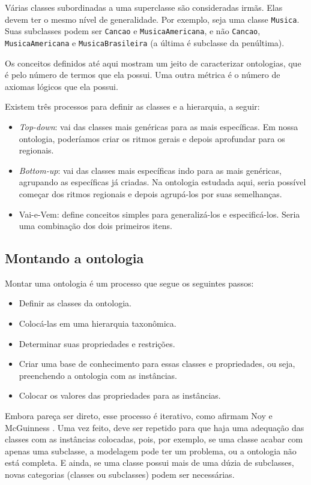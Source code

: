 Várias classes subordinadas a uma superclasse são consideradas irmãs. Elas devem ter o mesmo nível de generalidade. Por exemplo, seja uma classe \texttt{Musica}. Suas subclasses podem ser \texttt{Cancao} e \texttt{MusicaAmericana}, e não \texttt{Cancao}, \texttt{MusicaAmericana} e \texttt{MusicaBrasileira} (a última é subclasse da penúltima).

Os conceitos definidos até aqui mostram um jeito de caracterizar ontologias, que é pelo número de termos que ela possui. Uma outra métrica é o número de axiomas lógicos que ela possui. 

Existem três processos para definir as classes e a hierarquia, a seguir:

\begin{itemize}
	\item \textit{Top-down}: vai das classes mais genéricas para as mais específicas. Em nossa ontologia, poderíamos criar os ritmos gerais e depois aprofundar para os regionais.
	\item \textit{Bottom-up}: vai das classes mais específicas indo para as mais genéricas, agrupando as específicas já criadas. Na ontologia estudada aqui, seria possível começar dos ritmos regionais e depois agrupá-los por suas semelhanças.
	\item Vai-e-Vem: define conceitos simples para generalizá-los e especificá-los. Seria uma combinação dos dois primeiros itens.
\end{itemize}

\subsection{Montando a ontologia}

Montar uma ontologia é um processo que segue os seguintes passos:

\begin{itemize}
	\item Definir as classes da ontologia.
	\item Colocá-las em uma hierarquia taxonômica.
	\item Determinar suas propriedades e restrições.
	\item Criar uma base de conhecimento para essas classes e propriedades, ou seja, preenchendo a ontologia com as instâncias.
	\item Colocar os valores das propriedades para as instâncias.
\end{itemize}

Embora pareça ser direto, esse processo é iterativo, como afirmam Noy e McGuinness \cite{ontoNoy}. Uma vez feito, deve ser repetido para que haja uma adequação das classes com as instâncias colocadas, pois, por exemplo, se uma classe acabar com apenas uma subclasse, a modelagem pode ter um problema, ou a ontologia não está completa. E ainda, se uma classe possui mais de uma dúzia de subclasses, novas categorias (classes ou subclasses) podem ser necessárias. 

